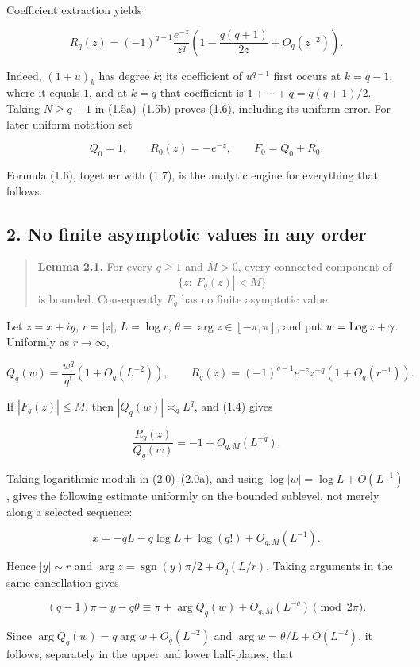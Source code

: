 Coefficient extraction yields

\[
 R_q(z)=(-1)^{q-1}\frac{e^{-z}}{z^q}
 \left(1-\frac{q(q+1)}{2z}+O_q(z^{-2})\right).
\tag{Inv-1.6}
\]

Indeed, \((1+u)_k\) has degree \(k\); its coefficient of \(u^{q-1}\) first
occurs at \(k=q-1\), where it equals \(1\), and at \(k=q\) that coefficient
is \(1+\cdots+q=q(q+1)/2\). Taking \(N\geq q+1\) in (1.5a)--(1.5b) proves
(1.6), including its uniform error. For later uniform notation set

\[
 Q_0=1,\qquad R_0(z)=-e^{-z},\qquad F_0=Q_0+R_0.
\tag{Inv-1.7}
\]

Formula (1.6), together with (1.7), is the analytic engine for everything
that follows.

\subsection{2. No finite asymptotic values in any order}

\begin{quote}
\textbf{Lemma 2.1.} For every \(q\geq1\) and \(M>0\), every connected
component of
\[
 \{z:|F_q(z)|<M\}
\]
is bounded. Consequently \(F_q\) has no finite asymptotic value.
\end{quote}

Let \(z=x+iy\), \(r=|z|\), \(L=\log r\),
\(\theta=\arg z\in[-\pi,\pi]\), and put \(w=\operatorname{Log} z+\gamma\). Uniformly
as \(r\to\infty\),

\[
 Q_q(w)=\frac{w^q}{q!}\left(1+O_q(L^{-2})\right),
 \qquad
 R_q(z)=(-1)^{q-1}e^{-z}z^{-q}\left(1+O_q(r^{-1})\right).
\tag{Inv-2.0}
\]

If \(|F_q(z)|\leq M\), then \(|Q_q(w)|\asymp_q L^q\), and (1.4) gives

\[
 \frac{R_q(z)}{Q_q(w)}=-1+O_{q,M}(L^{-q}).
\tag{Inv-2.0a}
\]

Taking logarithmic moduli in (2.0)--(2.0a), and using
\(\log|w|=\log L+O(L^{-1})\), gives the following estimate uniformly on
the bounded sublevel, not merely along a selected sequence:

\[
 x=-qL-q\log L+\log(q!)+O_{q,M}(L^{-1}).
\tag{Inv-2.1}
\]

Hence \(|y|\sim r\) and
\(\arg z=\operatorname{sgn}(y)\pi/2+O_q(L/r)\). Taking arguments in the
same cancellation gives

\[
 (q-1)\pi-y-q\theta
 \equiv \pi+\arg Q_q(w)+O_{q,M}(L^{-q})\pmod{2\pi}.
\]

Since \(\arg Q_q(w)=q\arg w+O_q(L^{-2})\) and
\(\arg w=\theta/L+O(L^{-2})\), it follows, separately in the upper and
lower half-planes, that

